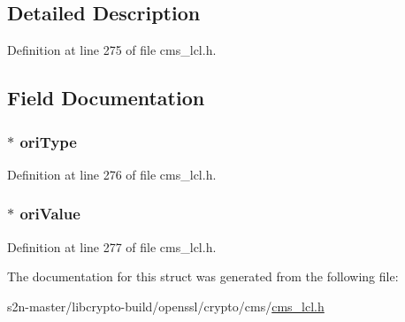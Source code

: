 \subsection{Detailed Description}


Definition at line 275 of file cms\+\_\+lcl.\+h.



\subsection{Field Documentation}
\subsubsection[{\texorpdfstring{ori\+Type}{oriType}}]{$\ast$ ori\+Type}\hypertarget{struct_c_m_s___other_recipient_info__st_a39ef9c59ccc7cee2f1544408fb21cb52}{}\label{struct_c_m_s___other_recipient_info__st_a39ef9c59ccc7cee2f1544408fb21cb52}


Definition at line 276 of file cms\+\_\+lcl.\+h.

\subsubsection[{\texorpdfstring{ori\+Value}{oriValue}}]{$\ast$ ori\+Value}\hypertarget{struct_c_m_s___other_recipient_info__st_a14ea7d5b53186a58c7f73aba7f621a05}{}\label{struct_c_m_s___other_recipient_info__st_a14ea7d5b53186a58c7f73aba7f621a05}


Definition at line 277 of file cms\+\_\+lcl.\+h.



The documentation for this struct was generated from the following file\+:\begin{DoxyCompactItemize}
\item 
s2n-\/master/libcrypto-\/build/openssl/crypto/cms/\hyperlink{cms__lcl_8h}{cms\+\_\+lcl.\+h}\end{DoxyCompactItemize}
